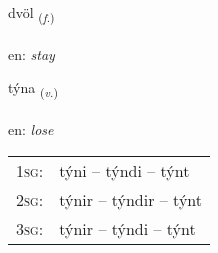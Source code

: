 \documentclass[frontgrid, backgrid]{flacards}\usepackage[]{graphicx}\usepackage[]{xcolor}
\begin{document}
\renewcommand{\flhead}{\vskip5pt \fboxsep=0pt {\small\bfseries\footnotesize Nafnorð | Noun}}
\renewcommand{\fcfoot}{\vskip5pt \fboxsep=0pt \hspace{2pt}{\small\bfseries\footnotesize 3K}}

\renewcommand{\blhead}{\vskip5pt {\small\bfseries\footnotesize Nafnorð | Noun }}
\renewcommand{\bcfoot}{\vskip5pt \hspace{2pt}{\small\bfseries\footnotesize 3K}}


{dvöl \small{\textsubscript{(\textit{f.})}} \\[1ex] %
\textphonetic{[tvœːl]} \\
en: \emph{stay} \\  [2ex]
\renewcommand*{\arraystretch}{0.8}
}

\renewcommand{\flhead}{\vskip5pt \fboxsep=0pt {\small\bfseries\footnotesize Sagnorð | Verb}}
\renewcommand{\fcfoot}{\vskip5pt \fboxsep=0pt \hspace{2pt}{\small\bfseries\footnotesize 3K}}

\renewcommand{\blhead}{\vskip5pt {\small\bfseries\footnotesize Sagnorð | Verb }}
\renewcommand{\bcfoot}{\vskip5pt \hspace{2pt}{\small\bfseries\footnotesize 3K}}


{týna \small{\textsubscript{(\textit{v.})}} \\[1ex] %
\textphonetic{[tʰiːna]} \\
en: \emph{lose} \\  [2ex]
\renewcommand*{\arraystretch}{0.8}
\begin{tabular}{p{1cm}l}
\textsc{1sg}: & týni -- týndi -- týnt \\ 
\textsc{2sg}: & týnir -- týndir -- týnt \\ 
\textsc{3sg}: & týnir -- týndi -- týnt \\ 
\end{tabular}
}
\end{document}

